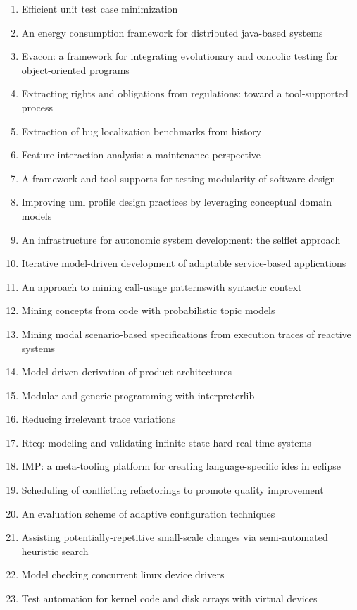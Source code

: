 \begin{enumerate}[itemsep=-1ex]
  \item Efficient unit test case minimization
  \item An energy consumption framework for distributed java-based systems
  \item Evacon: a framework for integrating evolutionary and concolic testing for object-oriented programs
  \item Extracting rights and obligations from regulations: toward a tool-supported process
  \item Extraction of bug localization benchmarks from history
  \item Feature interaction analysis: a maintenance perspective
  \item A framework and tool supports for testing modularity of software design
  \item Improving uml profile design practices by leveraging conceptual domain models
  \item An infrastructure for autonomic system development: the selflet approach
  \item Iterative model-driven development of adaptable service-based applications
  \item An approach to mining call-usage patternswith syntactic context
  \item Mining concepts from code with probabilistic topic models
  \item Mining modal scenario-based specifications from execution traces of reactive systems
  \item Model-driven derivation of product architectures
  \item Modular and generic programming with interpreterlib
  \item Reducing irrelevant trace variations
  \item Rteq: modeling and validating infinite-state hard-real-time systems
  \item IMP: a meta-tooling platform for creating language-specific ides in eclipse
  \item Scheduling of conflicting refactorings to promote quality improvement
  \item An evaluation scheme of adaptive configuration techniques
  \item Assisting potentially-repetitive small-scale changes via semi-automated heuristic search
  \item Model checking concurrent linux device drivers
  \item Test automation for kernel code and disk arrays with virtual devices

\end{enumerate}
